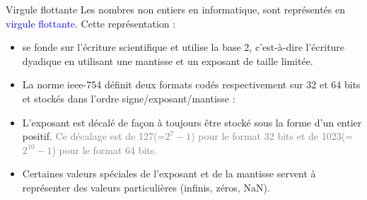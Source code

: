 \documentclass[10pt]{beamer}
\begin{document}
\begin{frame}{\Ctitle}{\stitle}
	\begin{alertblock}{Virgule flottante}
		Les nombres non entiers en informatique, sont représentés en  \textcolor{blue}{virgule flottante}. Cette représentation :
		\begin{itemize}
			\item<1-> se fonde sur l'écriture scientifique et utilise la base 2, c'est-à-dire l'écriture dyadique en utilisant une mantisse et un exposant de taille limitée.
			\item<2-> La norme {\sc ieee-754} définit deux formats codés respectivement sur 32 et 64 bits et stockés dans l'ordre signe/exposant/mantisse : \\
            \item<4->L'exposant est décalé de façon à toujours être stocké sous la forme d'un entier positif. \textcolor{gray}{Ce décalage est de 127(=$2^7-1$) pour le format 32 bits et de 1023(=$2^{10}-1$) pour le format 64 bits.}
            \item<5-> Certaines valeurs spéciales de l'exposant et de la mantisse servent à représenter des valeurs particulières (infinis, zéros, NaN).
		\end{itemize}
	\end{alertblock}
\end{frame}
\end{document}
